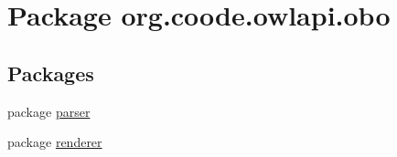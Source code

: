 \hypertarget{namespaceorg_1_1coode_1_1owlapi_1_1obo}{\section{Package org.\-coode.\-owlapi.\-obo}
\label{namespaceorg_1_1coode_1_1owlapi_1_1obo}
}
\subsection*{Packages}
\begin{DoxyCompactItemize}
\item 
package \hyperlink{namespaceorg_1_1coode_1_1owlapi_1_1obo_1_1parser}{parser}
\item 
package \hyperlink{namespaceorg_1_1coode_1_1owlapi_1_1obo_1_1renderer}{renderer}
\end{DoxyCompactItemize}
